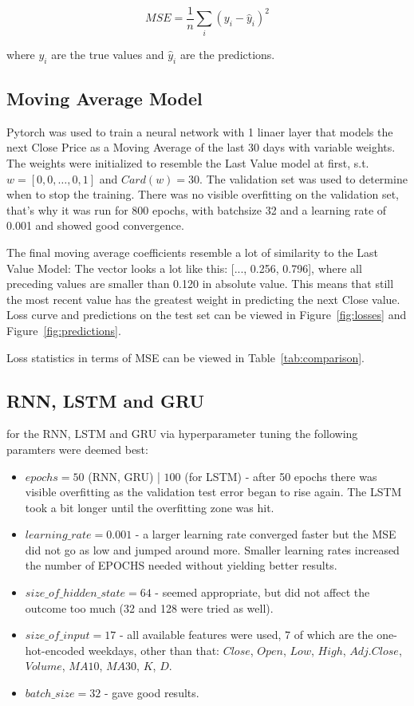 \documentclass[utf8x]{ctexart}
\begin{document}
\[ MSE = \frac{1}{n} \sum_i{(y_i - \hat{y}_i)^2}\]

where $y_i$ are the true values and $\hat{y}_i$ are the predictions.

\subsection{Moving Average Model}

Pytorch was used to train a neural network with 1 linaer layer that models the next Close Price as a Moving Average of the last 30 days with variable weights. The weights were initialized to resemble the Last Value model at first, s.t. $w = [0,0,\dots,0,1]$ and $Card(w) = 30$. The validation set was used to determine when to stop the training. There was no visible overfitting on the validation set, that's why it was run for 800 epochs, with batchsize 32 and a learning rate of 0.001 and showed good convergence.

The final moving average coefficients resemble a lot of similarity to the Last Value Model: The vector looks a lot like this: [..., 0.256, 0.796], where all preceding values are smaller than 0.120 in absolute value. This means that still the most recent value has the greatest weight in predicting the next Close value.
Loss curve and predictions on the test set can be viewed in Figure~\ref{fig:losses} and Figure~\ref{fig:predictions}.

Loss statistics in terms of MSE can be viewed in Table~\ref{tab:comparison}.

\subsection{RNN, LSTM and GRU}

for the RNN, LSTM and GRU via hyperparameter tuning the following paramters were deemed best:
\begin{itemize}
  \item $epochs = 50$ (RNN, GRU) | $100$ (for LSTM) - after 50 epochs there was visible overfitting as the validation test error began to rise again. The LSTM took a bit longer until the overfitting zone was hit.
  \item $learning\_rate = 0.001$ - a larger learning rate converged faster but the MSE did not go as low and jumped around more. Smaller learning rates increased the number of EPOCHS needed without yielding better results.
  \item $size\_of\_hidden\_state = 64$ - seemed appropriate, but did not affect the outcome too much (32 and 128 were tried as well).
  \item $size\_of\_input = 17$ - all available features were used, 7 of which are the one-hot-encoded weekdays, other than that: $Close$, $Open$, $Low$, $High$, $Adj.Close$, $Volume$, $MA10$, $MA30$, $K$, $D$.
  \item $batch\_size = 32 $ - gave good results.
\end{itemize}
\end{document}
